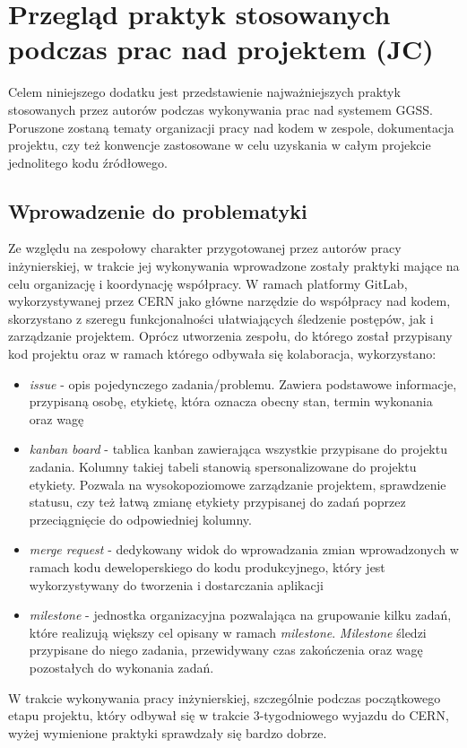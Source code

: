 \appendix
\chapter{Przegląd praktyk stosowanych podczas prac nad projektem (JC)}
\label{cha:practices}

Celem niniejszego dodatku jest przedstawienie najważniejszych praktyk stosowanych przez autorów podczas wykonywania prac nad systemem GGSS. Poruszone zostaną tematy organizacji pracy nad kodem w zespole, dokumentacja projektu, czy też konwencje zastosowane w celu uzyskania w całym projekcie jednolitego kodu źródłowego.

\section{Wprowadzenie do problematyki}
Ze względu na zespołowy charakter przygotowanej przez autorów pracy inżynierskiej, w trakcie jej wykonywania wprowadzone zostały praktyki mające na celu organizację i koordynację współpracy. W ramach platformy GitLab, wykorzystywanej przez CERN jako główne narzędzie do współpracy nad kodem, skorzystano z szeregu funkcjonalności ułatwiających śledzenie postępów, jak i zarządzanie projektem. Oprócz utworzenia zespołu, do którego został przypisany kod projektu oraz w ramach którego odbywała się kolaboracja, wykorzystano:
\begin{itemize}
\item \emph{issue} - opis pojedynczego zadania/problemu. Zawiera podstawowe informacje, przypisaną osobę, etykietę, która oznacza obecny stan, termin wykonania oraz wagę
\item \emph{kanban board} - tablica kanban zawierająca wszystkie przypisane do projektu zadania. Kolumny takiej tabeli stanowią spersonalizowane do projektu etykiety. Pozwala na wysokopoziomowe zarządzanie projektem, sprawdzenie statusu, czy też łatwą zmianę etykiety przypisanej do zadań poprzez przeciągnięcie do odpowiedniej kolumny. %
\item \emph{merge request} - dedykowany widok do wprowadzania zmian wprowadzonych w ramach kodu deweloperskiego do kodu produkcyjnego, który jest wykorzystywany do tworzenia i dostarczania aplikacji
\item \emph{milestone} - jednostka organizacyjna pozwalająca na grupowanie kilku zadań, które realizują większy cel opisany w ramach \emph{milestone}. \emph{Milestone} śledzi przypisane do niego zadania, przewidywany czas zakończenia oraz wagę pozostałych do wykonania zadań.
\end{itemize}
W trakcie wykonywania pracy inżynierskiej, szczególnie podczas początkowego etapu projektu, który odbywał się w trakcie 3-tygodniowego wyjazdu do CERN, wyżej wymienione praktyki sprawdzały się bardzo dobrze.

